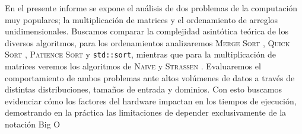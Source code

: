 En el presente informe se expone el análisis de dos problemas de la computación muy populares; la multiplicación de matrices y el ordenamiento de arreglos unidimensionales. Buscamos 
comparar la complejidad asintótica teórica de los diversos algoritmos, para los ordenamientos analizaremos \textsc{Merge Sort} \cite{gfg_merge_sort}, \textsc{Quick Sort} \cite{gfg_quick_sort}, \textsc{Patience Sort} \cite{gfg_patience_sorting} y \texttt{std::sort},
mientras que para la multiplicación de matrices veremos los algoritmos de \textsc{Naive} y \textsc{Strassen} \cite{medium_strassen}.
Evaluaremos el comportamiento de ambos problemas ante altos volúmenes de datos a través de distintas distribuciones, tamaños de entrada y dominios. Con esto buscamos evidenciar
cómo los factores del hardware impactan en los tiempos de ejecución, demostrando en la práctica las limitaciones de depender exclusivamente de la notación Big O
